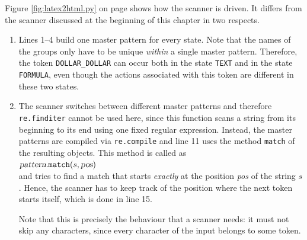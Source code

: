 \noindent
Figure \ref{fig:latex2html.py} on page \pageref{fig:latex2html.py} shows how the scanner is driven.  It differs
from the scanner discussed at the beginning of this chapter in two respects.
\begin{enumerate}
\item Lines 1--4 build one master pattern for every state.  Note that the names of the groups only have to be
      unique \emph{within} a single master pattern.  Therefore, the token \texttt{DOLLAR\_DOLLAR} can occur both
      in the state \texttt{TEXT} and in the state \texttt{FORMULA}, even though the actions associated with this
      token are different in these two states.
\item The scanner switches between different master patterns and therefore
      \texttt{re.finditer} cannot be used here, since this function scans a string from its beginning to its
      end using one fixed regular expression.  Instead, the master patterns are compiled via
      \texttt{re.compile} and line 11 uses the method
      \texttt{match} of the resulting objects.  This method is called as
      \\[0.2cm]
      \hspace*{1.3cm}
      $\textsl{pattern}.\texttt{match}(s, \textsl{pos})$
      \\[0.2cm]
      and tries to find a match that starts \emph{exactly} at the position \textsl{pos} of the string $s$.
      Hence, the scanner has to keep track of the position where the next token starts itself, which is done in
      line 15.

      Note that this is precisely the behaviour that a scanner needs: it must not skip any characters, since
      every character of the input belongs to some token.
\end{enumerate}

